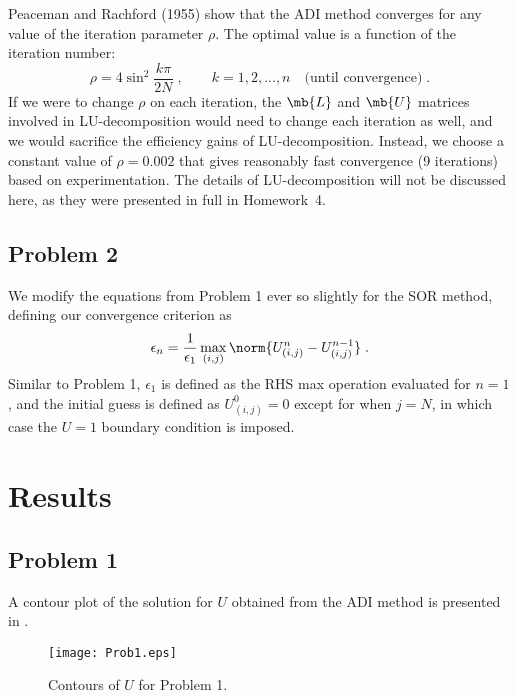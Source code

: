 \documentclass[11pt]{article}
\begin{document}
Peaceman and Rachford (1955) show that the ADI method converges for any value of the iteration parameter $\rho$. The optimal value is a function of the iteration number:
\begin{equation}
\rho = 4 \sin^2 \frac{k \pi}{2 N}
\;, \qquad
k = 1, 2, ..., n \quad \text{(until convergence)}
\;.
\end{equation}
If we were to change $\rho$ on each iteration, the $\mb{L}$ and $\mb{U}$ matrices involved in LU-decomposition would need to change each iteration as well, and we would sacrifice the efficiency gains of LU-decomposition. Instead, we choose a constant value of $\rho = 0.002$ that gives reasonably fast convergence (9 iterations) based on experimentation. The details of LU-decomposition will not be discussed here, as they were presented in full in Homework~4.

\subsection{Problem 2}

We modify the equations from Problem 1 ever so slightly for the SOR method, defining our convergence criterion as
\begin{equation}
\epsilon_n = \frac{1}{\epsilon_1} \max_{(i,j)} \norm{U_{(i,j)}^{n} - U_{(i,j)}^{n-1}}
\;.
\end{equation}
Similar to Problem 1, $\epsilon_1$ is defined as the RHS max operation evaluated for $n=1$, and the initial guess is defined as $U_{(i,j)}^0 = 0$ except for when $j=N$, in which case the $U=1$ boundary condition is imposed.

\section{Results} %

\subsection{Problem 1}

A contour plot of the solution for $U$ obtained from the ADI method is presented in .

\begin{figure}[h!]
\begin{center}
\texttt{[image: Prob1.eps]}
\\[0.5cm]
\caption{Contours of $U$ for Problem 1.}
\label{fig:Prob1}
\end{center}
\end{figure}
\end{document}
